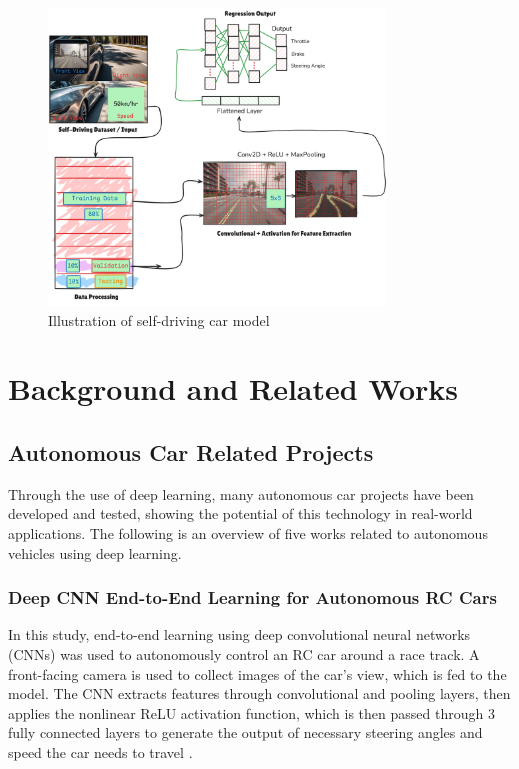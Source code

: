 \documentclass{article} %
\begin{document}
\begin{figure}[H]
    \centering
    \includegraphics[width=0.8\textwidth]{mif}
    \caption{Illustration of self-driving car model}
    \label{fig:my_label}
\end{figure}





\section{Background and Related Works}
\label{headings}

\subsection{Autonomous Car Related Projects}

Through the use of deep learning, many autonomous car projects have been developed and tested, showing the potential of this technology in real-world applications. 
The following is an overview of five works related to autonomous vehicles using deep learning.  


\subsubsection{Deep CNN End-to-End Learning for Autonomous RC Cars \citep{bhutta2023deep}}

 
In this study, end-to-end learning using deep convolutional neural networks (CNNs) was used to autonomously control an RC car around a race track. 
A front-facing camera is used to collect images of the car’s view, which is fed to the model. The CNN extracts features through convolutional and pooling layers, 
then applies the nonlinear ReLU activation function, which is then passed through 3 fully connected layers to generate the output of necessary steering angles 
and speed the car needs to travel \citep{bhutta2023deep}.
\end{document}
